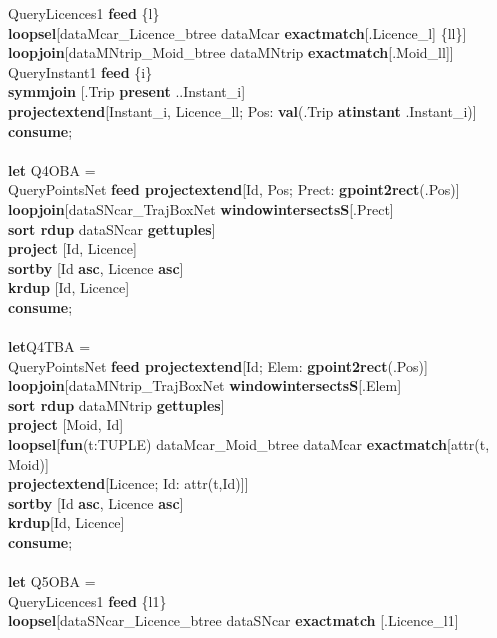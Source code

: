 \documentclass[a4paper]{article}
\newcommand{\op}[1]{\textbf{#1}}
\begin{document}
\begin{scriptsize}
\begin{tabbing}
\>QueryLicences1 \op{feed} \{l\}\\
\>\>\op{loopsel}[dataMcar\_Licence\_btree dataMcar \op{exactmatch}[.Licence\_l] \{ll\}]\\
\>\>\>\op{loopjoin}[dataMNtrip\_Moid\_btree dataMNtrip \op{exactmatch}[.Moid\_ll]]\\
\>QueryInstant1 \op{feed} \{i\}\\
\>\op{symmjoin} [.Trip \op{present} ..Instant\_i]\\
\>\>\op{projectextend}[Instant\_i, Licence\_ll; Pos: \op{val}(.Trip \op{atinstant} .Instant\_i)]\\
\op{consume};\\
\\
\op{let} Q4OBA =\\
\> QueryPointsNet \op{feed projectextend}[Id, Pos; Prect: \op{gpoint2rect}(.Pos)]\\
\>\op{loopjoin}[dataSNcar\_TrajBoxNet \op{windowintersectsS}[.Prect]\\
\>\>\>\op{sort rdup} dataSNcar \op{gettuples}]\\
\>\op{project} [Id, Licence]\\
\>\op{sortby} [Id \op{asc}, Licence \op{asc}]\\
\>\op{krdup} [Id, Licence]\\
\op{consume};\\
\\
\op{let}Q4TBA =\\
\>QueryPointsNet \op{feed projectextend}[Id; Elem: \op{gpoint2rect}(.Pos)]\\
\>\op{loopjoin}[dataMNtrip\_TrajBoxNet \op{windowintersectsS}[.Elem]\\
\>\>\>\op{sort rdup} dataMNtrip \op{gettuples}]\\
\>\op{project} [Moid, Id]\\
\>\op{loopsel}[\op{fun}(t:TUPLE) dataMcar\_Moid\_btree dataMcar \op{exactmatch}[attr(t, Moid)]\\
\>\>\op{projectextend}[Licence; Id: attr(t,Id)]]\\
\>\op{sortby} [Id \op{asc}, Licence \op{asc}]\\
\>\op{krdup}[Id, Licence]\\
\op{consume};\\
\\
\op{let} Q5OBA = \\
\>QueryLicences1 \op{feed} \{l1\}\\
\>\>\op{loopsel}[dataSNcar\_Licence\_btree dataSNcar \op{exactmatch} [.Licence\_l1]\\

\end{tabbing}
\end{scriptsize}
\end{document}
